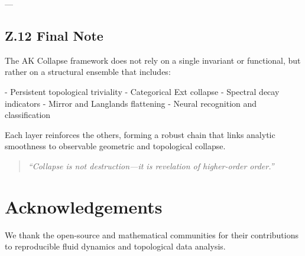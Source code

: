 \documentclass[11pt]{article}
\theoremstyle{definition}
\begin{document}
---

\subsection*{Z.12 Final Note}

The AK Collapse framework does not rely on a single invariant or functional, but rather on a structural ensemble that includes:

- Persistent topological triviality
- Categorical Ext collapse
- Spectral decay indicators
- Mirror and Langlands flattening
- Neural recognition and classification

Each layer reinforces the others, forming a robust chain that links analytic smoothness to observable geometric and topological collapse.

\begin{quote}
\textit{“Collapse is not destruction—it is revelation of higher-order order.”}
\end{quote}



\section*{Acknowledgements}
We thank the open-source and mathematical communities for their contributions to reproducible fluid dynamics and topological data analysis.
\end{document}
